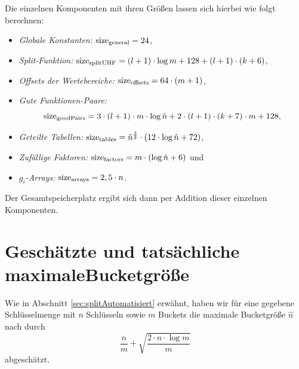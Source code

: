 \documentclass[a4paper,12pt,twoside]{report}
\begin{document}
Die einzelnen Komponenten mit ihren Größen lassen sich hierbei wie folgt berechnen:
\begin{itemize}
 \item \emph{Globale Konstanten:} $\operatorname{size}_{\operatorname{general}}=24$,
 \item \emph{Split-Funktion:} $\operatorname{size}_{\operatorname{splitUHF}}=(l+1)\cdot\log m+128+(l+1)\cdot(k+6)$,
 \item \emph{Offsets der Wertebereiche:} $\operatorname{size}_{\operatorname{offsets}}=64\cdot(m+1)$,
 \item \emph{Gute Funktionen-Paare:} \[\operatorname{size}_{\operatorname{goodPairs}}=3\cdot(l+1)\cdot m\cdot\log\hat{n}+2\cdot(l+1)\cdot(k+7)\cdot m+128,\]
 \item \emph{Geteilte Tabellen:} $\operatorname{size}_{\operatorname{tables}}=\hat{n}^{\frac{3}{2}}\cdot(12\cdot\log\hat{n}+72)$,
 \item \emph{Zufällige Faktoren:} $\operatorname{size}_{\operatorname{factors}}=m\cdot(\log\hat{n}+6)$ und
 \item \emph{$g_i$-Arrays:} $\operatorname{size}_{\operatorname{arrays}}=2,5\cdot n$.
\end{itemize}
Der Gesamtspeicherplatz ergibt sich dann per Addition dieser einzelnen Komponenten.


\section[Geschätzte und tatsächliche maximale Bucketgröße]{Geschätzte und tatsächliche maximale\linebreak Bucketgröße}
\label{sec:schaetzungBucketgroesse}

Wie in Abschnitt \ref{sec:splitAutomatisiert} erwähnt, haben wir für eine gegebene Schlüsselmenge mit $n$ Schlüsseln sowie $m$ Buckets die maximale Bucketgröße $\hat{n}$ nach \cite[Theorem 1]{Raab1998} durch \[\frac{n}{m}+\sqrt{\frac{2\cdot n\cdot\log m}{m}}\] abgeschätzt.
\end{document}
